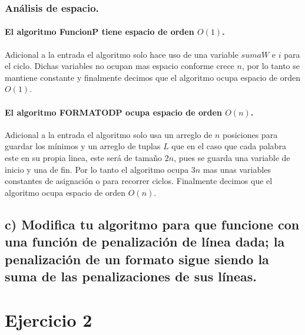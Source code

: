 \documentclass[12pt]{article}
\begin{document}
	\subsubsection{Análisis de espacio.}
	\paragraph{El algoritmo FuncionP tiene espacio de orden $O(1)$.} Adicional a la entrada el algoritmo solo hace uso de una variable $sumaW$ e $i$ para el ciclo. Dichas variables no ocupan mas espacio conforme crece $n$, por lo tanto se mantiene constante y finalmente decimos que el algoritmo ocupa espacio de orden $O(1)$.
	\paragraph{El algoritmo FORMATODP ocupa espacio de orden $O(n)$.} Adicional a la entrada el algoritmo solo usa un arreglo de $n$ posiciones para guardar los mínimos y un arreglo de tuplas $L$ que en el caso que cada palabra este en su propia linea, este será de tamaño $2n$, pues se guarda una variable de inicio y una de fin. Por lo tanto el algoritmo ocupa $3n$ mas unas variables constantes de asignación o para recorrer ciclos. Finalmente decimos que el algoritmo ocupa espacio de orden $O(n)$.
	\subsection{c) Modifica tu algoritmo para que funcione con una función de penalización de línea dada; la penalización de un formato sigue siendo la suma de las penalizaciones de sus líneas.}
\section{Ejercicio 2}
\end{document}
